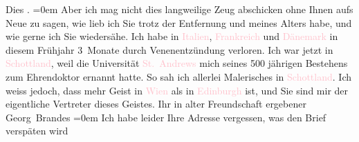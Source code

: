            \noindent{}Dies \label{K_L02033_2v}\label{K_L02033_2h}.\pend
           \leftskip=0em{}\pstart
           \noindent{}Aber ich mag nicht dies langweilige Zeug abschicken ohne Ihnen aufs Neue zu sagen,
               wie lieb ich Sie trotz der Entfernung und meines Alters habe, und wie gerne ich Sie
               wiedersähe.\pend
           \pstart
           Ich habe in \textcolor{pink}{Italien}{}\ledrightnote{\textcolor{pink}{Italien}}, \textcolor{pink}{Frankreich}{}\ledrightnote{\textcolor{pink}{Frankreich}} und \textcolor{pink}{Dänemark}{}\ledrightnote{\textcolor{pink}{Dänemark}} in diesem
               Frühjahr 3 Monate durch Venenentzündung verloren. Ich war jetzt in {\pb}\textcolor{pink}{Schottland}{}\ledrightnote{\textcolor{pink}{Schottland}}, weil die Universität \textcolor{pink}{St. Andrews}{}\ledrightnote{\textcolor{pink}{University of St. Andrews}} mich \label{K_L02033_3v}\label{K_L02033_3h} seines 500 jährigen Bestehens zum Ehrendoktor ernannt hatte. So
               sah ich allerlei Malerisches in \textcolor{pink}{Schottland}{}\ledrightnote{\textcolor{pink}{Schottland}}.\pend
           \pstart
           Ich weiss jedoch, dass mehr Geist in \textcolor{pink}{Wien}{}\ledrightnote{\textcolor{pink}{Wien}} als in \textcolor{pink}{Edinburgh}{}\ledrightnote{\textcolor{pink}{Edinburgh}} ist, und Sie sind mir der eigentliche
               Vertreter dieses Geistes.\pend
           \pstart
           Ihr in alter Freundschaft ergebener{\\[\baselineskip]}\spacefill\mbox{Georg Brandes}\pend
           \leftskip=0em{}\pstart
           \noindent{}Ich habe leider Ihre Adresse vergessen, was den Brief verspäten wird\pend
           \endnumbering{}  
      